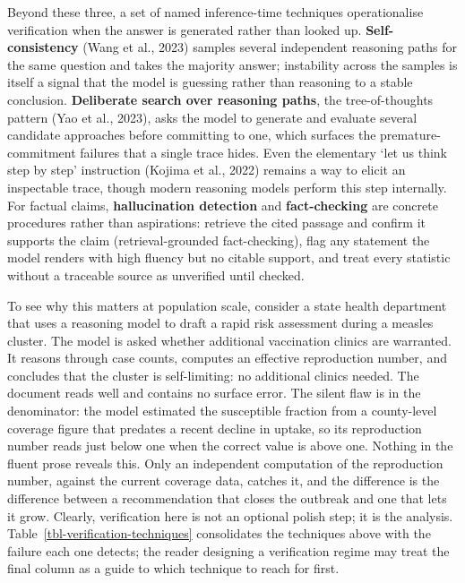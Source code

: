 \documentclass[
  letterpaper,
  11pt]{scrbook}
\begin{document}
Beyond these three, a set of named inference-time techniques
operationalise verification when the answer is generated rather than
looked up. \textbf{Self-consistency} ({Wang et al.}, 2023) samples
several independent reasoning paths for the same question and takes the
majority answer; instability across the samples is itself a signal that
the model is guessing rather than reasoning to a stable conclusion.
\textbf{Deliberate search over reasoning paths}, the tree-of-thoughts
pattern ({Yao et al.}, 2023), asks the model to generate and evaluate
several candidate approaches before committing to one, which surfaces
the premature-commitment failures that a single trace hides. Even the
elementary `let us think step by step' instruction (Kojima et al., 2022)
remains a way to elicit an inspectable trace, though modern reasoning
models perform this step internally. For factual claims,
\textbf{hallucination detection} and \textbf{fact-checking} are concrete
procedures rather than aspirations: retrieve the cited passage and
confirm it supports the claim (retrieval-grounded fact-checking), flag
any statement the model renders with high fluency but no citable
support, and treat every statistic without a traceable source as
unverified until checked.

To see why this matters at population scale, consider a state health
department that uses a reasoning model to draft a rapid risk assessment
during a measles cluster. The model is asked whether additional
vaccination clinics are warranted. It reasons through case counts,
computes an effective reproduction number, and concludes that the
cluster is self-limiting: no additional clinics needed. The document
reads well and contains no surface error. The silent flaw is in the
denominator: the model estimated the susceptible fraction from a
county-level coverage figure that predates a recent decline in uptake,
so its reproduction number reads just below one when the correct value
is above one. Nothing in the fluent prose reveals this. Only an
independent computation of the reproduction number, against the current
coverage data, catches it, and the difference is the difference between
a recommendation that closes the outbreak and one that lets it grow.
Clearly, verification here is not an optional polish step; it is the
analysis. Table~\ref{tbl-verification-techniques} consolidates the
techniques above with the failure each one detects; the reader designing
a verification regime may treat the final column as a guide to which
technique to reach for first.
\end{document}
